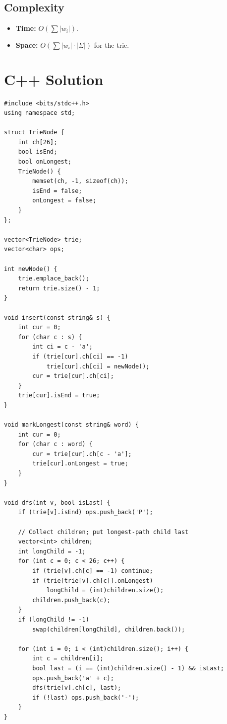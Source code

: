 \documentclass[11pt,a4paper]{article}
\begin{document}
\subsection{Complexity}
\begin{itemize}
    \item \textbf{Time:} $O(\sum |w_i|)$.
    \item \textbf{Space:} $O(\sum |w_i| \cdot |\Sigma|)$ for the trie.
\end{itemize}

\section{C++ Solution}

\begin{lstlisting}
#include <bits/stdc++.h>
using namespace std;

struct TrieNode {
    int ch[26];
    bool isEnd;
    bool onLongest;
    TrieNode() {
        memset(ch, -1, sizeof(ch));
        isEnd = false;
        onLongest = false;
    }
};

vector<TrieNode> trie;
vector<char> ops;

int newNode() {
    trie.emplace_back();
    return trie.size() - 1;
}

void insert(const string& s) {
    int cur = 0;
    for (char c : s) {
        int ci = c - 'a';
        if (trie[cur].ch[ci] == -1)
            trie[cur].ch[ci] = newNode();
        cur = trie[cur].ch[ci];
    }
    trie[cur].isEnd = true;
}

void markLongest(const string& word) {
    int cur = 0;
    for (char c : word) {
        cur = trie[cur].ch[c - 'a'];
        trie[cur].onLongest = true;
    }
}

void dfs(int v, bool isLast) {
    if (trie[v].isEnd) ops.push_back('P');

    // Collect children; put longest-path child last
    vector<int> children;
    int longChild = -1;
    for (int c = 0; c < 26; c++) {
        if (trie[v].ch[c] == -1) continue;
        if (trie[trie[v].ch[c]].onLongest)
            longChild = (int)children.size();
        children.push_back(c);
    }
    if (longChild != -1)
        swap(children[longChild], children.back());

    for (int i = 0; i < (int)children.size(); i++) {
        int c = children[i];
        bool last = (i == (int)children.size() - 1) && isLast;
        ops.push_back('a' + c);
        dfs(trie[v].ch[c], last);
        if (!last) ops.push_back('-');
    }
}


\end{lstlisting}
\end{document}
